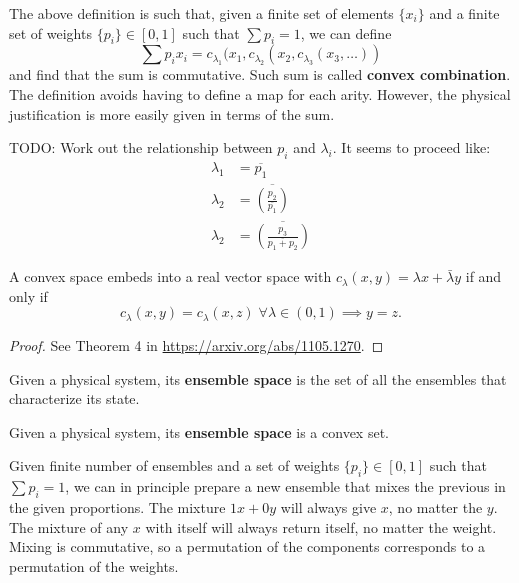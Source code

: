 \documentclass[11pt]{article}
\begin{document}
\begin{remark}
	The above definition is such that, given a finite set of elements $\{x_i\}$ and a finite set of weights $\{p_i\} \in [0,1]$ such that $\sum p_i = 1$, we can define
	$$\sum p_i x_i = c_{\lambda_1}(x_1, c_{\lambda_2}(x_2, c_{\lambda_3}(x_3, \dots))$$
	and find that the sum is commutative. Such sum is called \textbf{convex combination}. The definition avoids having to define a map for each arity. However, the physical justification is more easily given in terms of the sum.
	
	TODO: Work out the relationship between $p_i$ and $\lambda_i$. It seems to proceed like:
	\begin{equation}
		\begin{aligned}
			\lambda_1 &= \overline{p_1} \\
			\lambda_2 &= \overline{\left(\frac{p_2}{\overline{p_1}}\right)} \\
			\lambda_2 &= \overline{\left(\frac{p_3}{\overline{p_1+p_2}}\right)}
		\end{aligned}
	\end{equation}
\end{remark}

\begin{prop}
	A convex space embeds into a real vector space with $c_\lambda(x,y) = \lambda x + \bar{\lambda}y$ if and only if
	$$ c_\lambda(x,y) = c_\lambda(x,z) \; \forall \lambda \in (0,1) \implies y = z. $$
\end{prop}
\begin{proof}
	See Theorem 4 in \url{https://arxiv.org/abs/1105.1270}.
\end{proof}

\begin{defn}
	Given a physical system, its \textbf{ensemble space} is the set of all the ensembles that characterize its state. 
\end{defn}

\begin{prop}
	Given a physical system, its \textbf{ensemble space} is a convex set. 
\end{prop}
\begin{justification}
	Given finite number of ensembles and a set of weights $\{p_i\} \in [0,1]$ such that $\sum p_i = 1$, we can in principle prepare a new ensemble that mixes the previous in the given proportions. The mixture $1x+0y$ will always give $x$, no matter the $y$. The mixture of any $x$ with itself will always return itself, no matter the weight. Mixing is commutative, so a permutation of the components corresponds to a permutation of the weights.
\end{justification}
\end{document}

